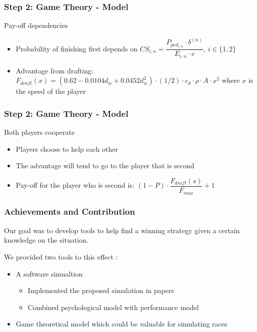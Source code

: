 \documentclass{beamer}
\begin{document}
\begin{frame}
\frametitle{Step 2: Game Theory - Model}
\begin{block}{Pay-off dependencies}
	\begin{itemize}
		\item Probability of finishing first depends on $CS_{i,n} = \dfrac{P_{ped_{i,n}} \cdot \delta^{(n)}}{E_{i,n} \cdot v},\ i\in\{1,2\}$
		\item Advantage from drafting: $F_{draft}(x) = (0.62 - 0.0104 d_w + 0.0452 d_w^2)\cdot (1/2)\cdot c_d\cdot \rho\cdot A\cdot x^2$ where $x$ is the speed of the player
	\end{itemize}
\end{block}
\end{frame}

\begin{frame}
\frametitle{Step 2: Game Theory - Model}
\begin{block}{Both players cooperate}
	\begin{itemize}
		\item Players choose to help each other
		\item The advantage will tend to go to the player that is second
		\item Pay-off for the player who is second is: $(1-P)\cdot \dfrac{F_{draft}(s)}{F_{max}} + 1$
	\end{itemize}
\end{block}
\end{frame}

\begin{frame}
\frametitle{Achievements and Contribution}

Our goal was to develop tools to help find a winning strategy given a certain knowledge on the situation. \\

\pause
\vspace{0.3cm}

We provided two tools to this effect :
\pause
\begin{itemize}
\item A software simualtion
  \begin{itemize}
	\item Implemented the proposed simulation in papers \vspace{0.1cm}
	\item Combined psychological model with performance model \vspace{0.1cm}
  \end{itemize}
\pause
\item Game theoretical model which could be valuable for simulating races \vspace{0.1cm}
\end{itemize}

\end{frame}
\end{document}
